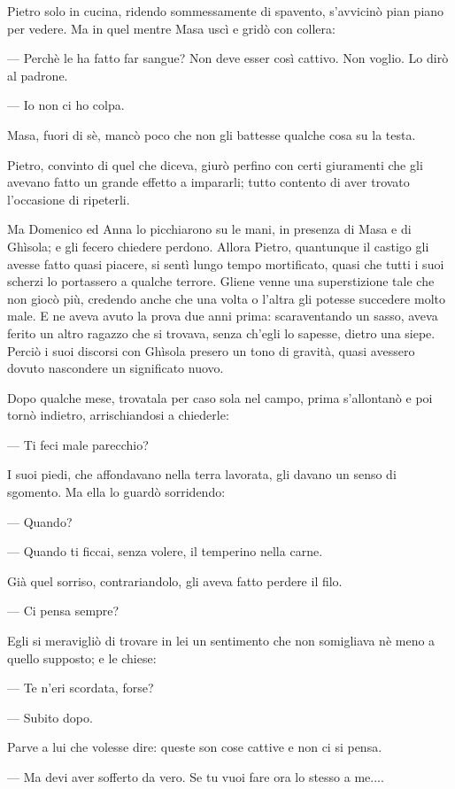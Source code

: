 Pietro solo in cucina, ridendo sommessamente di spavento, s’avvicinò pian piano per vedere. Ma in quel mentre Masa uscì e gridò con collera:

— Perchè le ha fatto far sangue? Non deve esser così cattivo. Non voglio. Lo dirò al padrone.

— Io non ci ho colpa.

Masa, fuori di sè, mancò poco che non gli battesse qualche cosa su la testa.

Pietro, convinto di quel che diceva, giurò perfino con certi giuramenti che gli avevano fatto un grande effetto a impararli; tutto contento di aver trovato l’occasione di ripeterli.

Ma Domenico ed Anna lo picchiarono su le mani, in presenza di Masa e di Ghìsola; e gli fecero chiedere perdono. Allora Pietro, quantunque il castigo gli avesse fatto quasi piacere, si sentì lungo tempo mortificato, quasi che tutti i suoi scherzi lo portassero a qualche terrore. Gliene venne una superstizione tale che non giocò più, credendo anche che una volta o l’altra gli potesse succedere molto male. E ne aveva avuto la prova due anni prima: scaraventando un sasso, aveva ferito un altro ragazzo che si trovava, senza ch’egli lo sapesse, dietro una siepe. Perciò i suoi discorsi con Ghìsola presero un tono di gravità, quasi avessero dovuto nascondere un significato nuovo.

Dopo qualche mese, trovatala per caso sola nel campo, prima s’allontanò e poi tornò indietro, arrischiandosi a chiederle:

— Ti feci male parecchio?

I suoi piedi, che affondavano nella terra lavorata, gli davano un senso di sgomento. Ma ella lo guardò sorridendo:

— Quando?

— Quando ti ficcai, senza volere, il temperino nella carne.

Già quel sorriso, contrariandolo, gli aveva fatto perdere il filo.

— Ci pensa sempre?

Egli si meravigliò di trovare in lei un sentimento che non somigliava nè meno a quello supposto; e le chiese:

— Te n'eri scordata, forse?

— Subito dopo.

Parve a lui che volesse dire: queste son cose cattive e non ci si pensa.

— Ma devi aver sofferto da vero. Se tu vuoi fare ora lo stesso a me....

